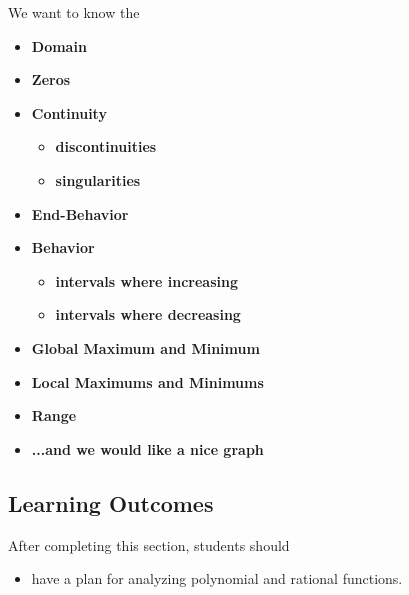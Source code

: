 \documentclass{ximera}
\begin{document}
We want to know the 
\begin{itemize}
     \item \textbf{\textcolor{red!80!black}{Domain}} 
     \item \textbf{\textcolor{red!80!black}{Zeros}} 
     \item \textbf{\textcolor{red!80!black}{Continuity}} 
\begin{itemize}
     \item \textbf{\textcolor{purple!85!blue}{discontinuities}} 
     \item \textbf{\textcolor{purple!85!blue}{singularities}} 
\end{itemize}
     \item \textbf{\textcolor{red!80!black}{End-Behavior}} 
     \item \textbf{\textcolor{red!80!black}{Behavior}} 
\begin{itemize}
     \item \textbf{\textcolor{purple!85!blue}{intervals where increasing}} 
     \item \textbf{\textcolor{purple!85!blue}{intervals where decreasing}} 
\end{itemize}
     \item \textbf{\textcolor{red!80!black}{Global Maximum and Minimum}} 
     \item \textbf{\textcolor{red!80!black}{Local Maximums and Minimums}} 
     \item \textbf{\textcolor{red!80!black}{Range}} 
     \item \textbf{\textcolor{blue!55!black}{...and we would like a nice graph}} 
\end{itemize}










\subsection*{Learning Outcomes}

\begin{sectionOutcomes}
After completing this section, students should 

\begin{itemize}
\item have a plan for analyzing polynomial and rational functions.
\end{itemize}
\end{sectionOutcomes}
\end{document}
